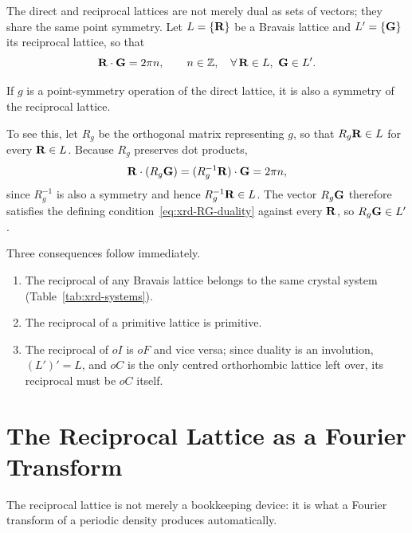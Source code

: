 The direct and reciprocal lattices are not merely dual as sets of vectors; they share the same point symmetry. Let $L = \{\cvect{R}\}$ be a Bravais lattice and $L' = \{\cvect{G}\}$ its reciprocal lattice, so that
\begin{equation}
    \cvect{R}\cdot\cvect{G} = 2\pi n, \qquad n\in\mathbb{Z},\quad \forall\,\cvect{R}\in L,\ \cvect{G}\in L'.
    \label{eq:xrd-RG-duality}
\end{equation}

\begin{fact}
If $g$ is a point-symmetry operation of the direct lattice, it is also a symmetry of the reciprocal lattice.
\end{fact}

To see this, let $R_g$ be the orthogonal matrix representing $g$, so that $R_g\cvect{R}\in L$ for every $\cvect{R}\in L$. Because $R_g$ preserves dot products,
\begin{equation}
    \cvect{R}\cdot(R_g\cvect{G}) = (R_g^{-1}\cvect{R})\cdot\cvect{G} = 2\pi n,
\end{equation}
since $R_g^{-1}$ is also a symmetry and hence $R_g^{-1}\cvect{R}\in L$. The vector $R_g\cvect{G}$ therefore satisfies the defining condition~\eqref{eq:xrd-RG-duality} against every $\cvect{R}$, so $R_g\cvect{G}\in L'$.

Three consequences follow immediately.
\begin{enumerate}
    \item The reciprocal of any Bravais lattice belongs to the same crystal system (Table~\ref{tab:xrd-systems}).
    \item The reciprocal of a primitive lattice is primitive.
    \item The reciprocal of $oI$ is $oF$ and vice versa; since duality is an involution, $(L')' = L$, and $oC$ is the only centred orthorhombic lattice left over, its reciprocal must be $oC$ itself.
\end{enumerate}

\section{The Reciprocal Lattice as a Fourier Transform}

The reciprocal lattice is not merely a bookkeeping device: it is what a Fourier transform of a periodic density produces automatically.

